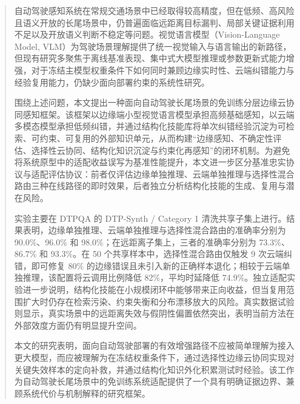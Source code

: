 

\begin{abstract}
自动驾驶感知系统在常规交通场景中已经取得较高精度，但在低频、高风险且语义开放的长尾场景中，仍普遍面临远距离目标漏判、局部关键证据利用不足以及开放语义判断不稳定等问题。视觉语言模型（Vision-Language Model, VLM）为驾驶场景理解提供了统一视觉输入与语言输出的新路径，但现有研究多聚焦于离线基准表现、集中式大模型推理或参数更新式能力增强，对于冻结主模型权重条件下如何同时兼顾边缘实时性、云端纠错能力与经验复用能力，仍缺少面向部署约束的系统性研究。

围绕上述问题，本文提出一种面向自动驾驶长尾场景的免训练分层边缘云协同感知框架。该框架以边缘端小型视觉语言模型承担高频基础感知，以云端多模态模型承担低频纠错，并通过结构化技能库将单次纠错经验沉淀为可检索、可约束、可复用的外部知识单元，从而构建“边缘感知、不确定性评估、选择性云协同、结构化知识沉淀与约束化再感知”的闭环机制。为避免将系统原型中的适配收益误写为基准性能提升，本文进一步区分基准忠实协议与适配评估协议：前者仅评估边缘单独推理、云端单独推理与选择性混合路由三种在线路径的即时效果，后者独立分析结构化技能的生成、复用与潜在风险。

实验主要在 DTPQA 的 DTP-Synth / Category 1 清洗共享子集上进行。结果表明，边缘单独推理、云端单独推理与选择性混合路由的准确率分别为 90.0\%、96.0\% 和 98.0\%；在远距离子集上，三者的准确率分别为 73.3\%、86.7\% 和 93.3\%。在 50 个共享样本中，选择性混合路由仅触发 9 次云端纠错，即可修复 80\% 的边缘错误且未引入新的正确样本退化；相较于云端单独推理，该配置将云调用比例降低 82\%，平均时延降低 74.9\%。独立适配实验进一步说明，结构化技能在小规模闭环中能够带来正向收益，但当复用范围扩大时仍存在检索污染、约束失衡和分布漂移放大的风险。真实数据试验则显示，真实场景中的远距离失效与假阴性偏置依然突出，表明当前方法在外部效度方面仍有明显提升空间。

本文的研究表明，面向自动驾驶部署的有效增强路径不应被简单理解为接入更大模型，而应被理解为在冻结权重条件下，通过选择性边缘云协同实现对关键失效样本的定向补救，并通过结构化知识外化积累测试时经验。该工作为自动驾驶长尾场景中的免训练系统适配提供了一个具有明确证据边界、兼顾系统代价与机制解释的研究框架。
\end{abstract}


